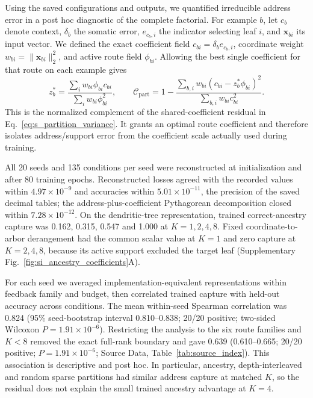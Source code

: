 Using the saved configurations and outputs, we quantified irreducible address
error in a post hoc diagnostic of the complete factorial. For example $b$, let
$c_b$ denote context, $\delta_b$ the somatic error, $e_{c_b,i}$ the indicator
selecting leaf $i$, and $\bm x_{bi}$ its input vector. We defined the exact
coefficient field $c_{bi}=\delta_b e_{c_b,i}$, coordinate weight
$w_{bi}=\lVert\bm x_{bi}\rVert_2^2$, and active route field $\phi_{bi}$.
Allowing the best single coefficient for that route on each example gives
\begin{equation}
 z_b^*=\frac{\sum_i w_{bi}\phi_{bi}c_{bi}}
 {\sum_iw_{bi}\phi_{bi}^2},\qquad
 \mathcal C_{\mathrm{part}}=1-
 \frac{\sum_{b,i}w_{bi}(c_{bi}-z_b^*\phi_{bi})^2}
 {\sum_{b,i}w_{bi}c_{bi}^2}.
\label{eq:s_trained_partition_capture}
\end{equation}
This is the normalized complement of the shared-coefficient residual in
Eq.~\ref{eq:s_partition_variance}. It grants an optimal route coefficient and
therefore isolates address/support error from the coefficient scale actually
used during training.

All 20 seeds and 135 conditions per seed were reconstructed at initialization
and after 80 training epochs. Reconstructed losses agreed with the recorded
values within $4.97\times10^{-9}$ and accuracies within $5.01\times10^{-11}$,
the precision of the saved decimal tables; the address-plus-coefficient Pythagorean
decomposition closed within $7.28\times10^{-12}$. On the dendritic-tree
representation, trained correct-ancestry capture was 0.162, 0.315, 0.547 and
1.000 at $K=1,2,4,8$. Fixed coordinate-to-arbor derangement had the common scalar value
at $K=1$ and zero capture at $K=2,4,8$, because its active support excluded the
target leaf (Supplementary Fig.~\ref{fig:si_ancestry_coefficients}A).

For each seed we averaged implementation-equivalent representations within
feedback family and budget, then correlated trained capture with held-out
accuracy across conditions. The mean within-seed Spearman correlation was
0.824 (95\% seed-bootstrap interval 0.810--0.838; 20/20 positive; two-sided
Wilcoxon $P=1.91\times10^{-6}$). Restricting the analysis to the six route
families and $K<8$ removed the exact full-rank boundary and gave 0.639
(0.610--0.665; 20/20 positive; $P=1.91\times10^{-6}$; Source Data, Table~\ref{tab:source_index}). This association is descriptive
and post hoc. In particular, ancestry, depth-interleaved and random sparse
partitions had similar address capture at matched $K$, so the residual does
not explain the small trained ancestry advantage at $K=4$.

